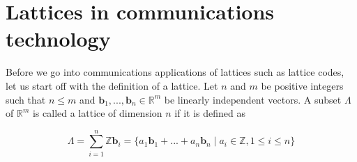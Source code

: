 \documentclass[english,12pt,a4paper,pdftex,sci,utf8]{aaltothesis}
\begin{document}
\clearpage

\section{Lattices in communications technology}

Before we go into communications applications of lattices such as lattice codes, let us start off with the definition of a lattice. Let $n$ and $m$ be positive integers such that $n \leq m$ and $\mathbf{b}_1, ... , \mathbf{b}_n \in \mathbb{R}^m$ be linearly independent vectors. A subset $\Lambda$ of $\mathbb{R}^m$ is called a lattice of dimension $n$ if it is defined as

\begin{equation}
\Lambda = \sum_{i=1}^{n} \mathbb{Z}\mathbf{b}_i = \{a_1\mathbf{b}_1 + ...+a_n\mathbf{b}_n \mid a_i \in \mathbb{Z}, 1 \leq i \leq n\}\label{eq:lattice}
\end{equation}
\end{document}
